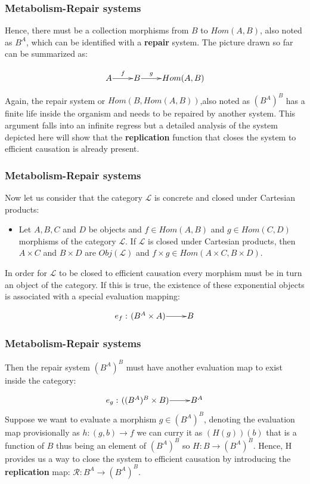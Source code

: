 \begin{frame}

\frametitle{Metabolism-Repair systems}

Hence, there must be a collection morphisms from $B$ to $Hom(A,B)$, also noted as $B^A$, which can be identified with a \textbf{repair} system. The picture drawn so far can be summarized as:

$$
	\xymatrix@1{
	A\ar[r]^f &B\ar[r]^-g &Hom(A,B)}
	$$

Again, the repair system or $Hom(B,Hom(A,B))$,also noted as $(B^A)^B$ has a finite life inside the organism and needs to be repaired by another system. This argument falls into an infinite regress but a detailed analysis of the system depicted here will show that the \textbf{replication} function that closes the system to efficient causation is already present.



\end{frame}


\begin{frame}

\frametitle{Metabolism-Repair systems}

Now let us consider that the category $\mathcal{L}$ is concrete and closed under Cartesian products:

\begin{itemize}
\item Let $A,B,C$ and $D$ be objects  and $f  \in{Hom(A,B)}$ and $g  \in{Hom(C,D)}$ morphisms of the category $\mathcal{L}$. If $\mathcal{L}$ is closed under Cartesian products, then $A\times{C}$ and $B\times{D}$ are $Obj(\mathcal{L})$ and $f\times{g}\in{Hom(A\times{C},B\times{D})}$.
\end{itemize}

In order for  $\mathcal{L}$  to be closed to efficient causation every morphism must be in turn an object of the category. If this is true, the existence of these exponential objects is associated with a special evaluation mapping:

$$
	e_f: \xymatrix@1{
	(B^A \times{A})\ar[r] &B}
	$$


\end{frame}

\begin{frame}

\frametitle{Metabolism-Repair systems}

Then the repair system $(B^A)^B$ must have another evaluation map to exist inside the category:

$$
	e_g: \xymatrix@1{
	((B^A)^B \times{B})\ar[r] & B^A}
	$$
Suppose we want to evaluate a morphism $g \in{(B^A)^B}$, denoting the evaluation map provisionally as $h: (g,b)\rightarrow{f} $ we can curry it as $(H(g))(b)$ that is a function of $B$ thus being an element of $(B^A)^B$ so $H: B \rightarrow{(B^A)^B} $. Hence, H provides us a way to close the system to efficient causation by introducing the \textbf{replication} map:
$\mathcal{R}: B^A \rightarrow{(B^A)^B} $.





\end{frame}